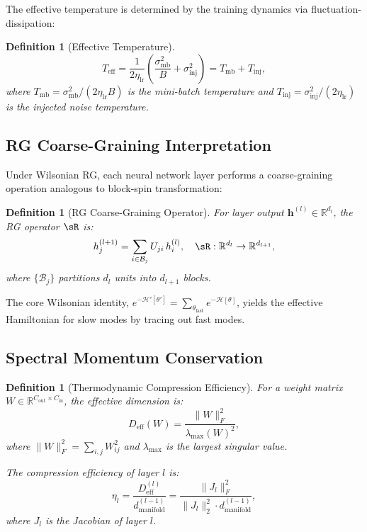 \documentclass[11pt, a4paper]{article}
\def\R{{\mathbb R}}
\newtheorem{dfn}[theo]{Definition}
\theoremstyle{plain}
\begin{document}
The effective temperature is determined by the training dynamics via fluctuation-dissipation:

\begin{dfn}[Effective Temperature]\label{dfn:teff}
\begin{equation}
T_{\mathrm{eff}} = \frac{1}{2\eta_{\mathrm{lr}}}\!\left(\frac{\sigma_{\mathrm{mb}}^2}{B} + \sigma_{\mathrm{inj}}^2\right) = T_{\mathrm{mb}} + T_{\mathrm{inj}},
\end{equation}
where $T_{\mathrm{mb}} = \sigma_{\mathrm{mb}}^2/(2\eta_{\mathrm{lr}}B)$ is the mini-batch temperature and $T_{\mathrm{inj}} = \sigma_{\mathrm{inj}}^2/(2\eta_{\mathrm{lr}})$ is the injected noise temperature.
\end{dfn}

\subsection{RG Coarse-Graining Interpretation}

Under Wilsonian RG, each neural network layer performs a coarse-graining operation analogous to block-spin transformation:

\begin{dfn}[RG Coarse-Graining Operator]\label{dfn:rg_operator}
For layer output $\mathbf{h}^{(l)} \in \R^{d_l}$, the RG operator $\sR$ is:
\begin{equation}
h^{(l+1)}_j = \sum_{i \in \mathcal{B}_j} U_{ji} \, h^{(l)}_i, \quad \sR: \R^{d_l} \to \R^{d_{l+1}},
\end{equation}
where $\{\mathcal{B}_j\}$ partitions $d_l$ units into $d_{l+1}$ blocks.
\end{dfn}

The core Wilsonian identity, $e^{-\mathcal{H}'[\theta']} = \sum_{\theta_{\mathrm{fast}}} e^{-\mathcal{H}[\theta]}$, yields the effective Hamiltonian for slow modes by tracing out fast modes.

\subsection{Spectral Momentum Conservation}

\begin{dfn}[Thermodynamic Compression Efficiency]\label{dfn:compression_efficiency}
For a weight matrix $W \in \R^{C_{\mathrm{out}} \times C_{\mathrm{in}}}$, the effective dimension is:
\begin{equation}
D_{\mathrm{eff}}(W) = \frac{\|W\|_F^2}{\lambda_{\max}(W)^2},
\end{equation}
where $\|W\|_F^2 = \sum_{i,j} W_{ij}^2$ and $\lambda_{\max}$ is the largest singular value.

The compression efficiency of layer $l$ is:
\begin{equation}
\eta_l = \frac{D_{\mathrm{eff}}^{(l)}}{d_{\mathrm{manifold}}^{(l-1)}} = \frac{\|J_l\|_F^2}{\|J_l\|_2^2 \cdot d_{\mathrm{manifold}}^{(l-1)}},
\end{equation}
where $J_l$ is the Jacobian of layer $l$.
\end{dfn}
\end{document}
